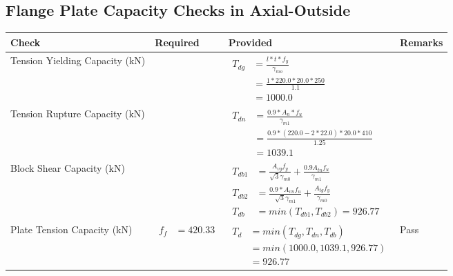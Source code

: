 \documentclass{article}%
\begin{document}
\subsection{Flange Plate Capacity Checks in Axial{-}Outside }%
\label{subsec:FlangePlateCapacityChecksinAxial{-}Outside}%
\renewcommand{\arraystretch}{1.2}%
\begin{longtable}{|p{4cm}|p{6cm}|p{5.5cm}|p{1.5cm}|}%
\hline%
\rowcolor{OsdagGreen}%
Check&Required&Provided&Remarks\\%
\hline%
\endhead%
\hline%
Tension Yielding Capacity (kN)&&$\begin{aligned} T_{dg} &= \frac{l*t*f_y}{\gamma_{mo}}\\ &=\frac{1*220.0*20.0*250}{1.1}\\ &=1000.0\end{aligned}$&\\%
\hline%
Tension Rupture Capacity (kN)&&$\begin{aligned} T_{dn} &= \frac{0.9*A_{n}*f_u}{\gamma_{m1}}\\ &=\frac{0.9*(220.0-2*22.0)*20.0*410}{1.25}\\ &=1039.1\end{aligned}$&\\%
\hline%
Block Shear Capacity (kN)&&$\begin{aligned}T_{db1} &= \frac{A_{vg} f_{y}}{\sqrt{3} \gamma_{m0}} + \frac{0.9 A_{tn} f_{u}}{\gamma_{m1}}\\ T_{db2} &= \frac{0.9*A_{vn} f_{u}}{\sqrt{3} \gamma_{m1}} + \frac{A_{tg} f_{y}}{\gamma_{m0}}\\ T_{db} &= min(T_{db1}, T_{db2})= 926.77\end{aligned}$&\\%
\hline%
Plate Tension Capacity (kN)&$\begin{aligned} f_f &=420.33\end{aligned}$&$\begin{aligned} T_d &= min(T_{dg},T_{dn},T_{db})\\ &= min(1000.0,1039.1,926.77)\\ &=926.77\end{aligned}$&Pass\\%
\hline%
\end{longtable}

%
\newpage%
\end{document}
